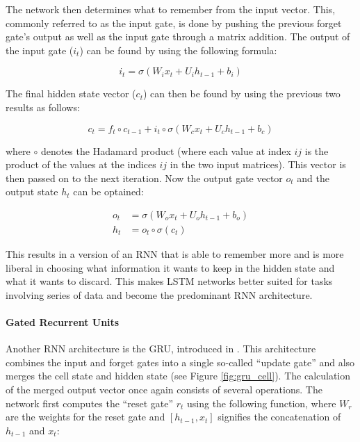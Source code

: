         The network then determines what to remember from the input vector.
        This, commonly referred to as the input gate, is done by pushing the previous forget gate's output as well as the input gate through a matrix addition. 
        The output of the input gate ($i_t$) can be found by using the following formula:

        \begin{equation}
            i_t = \sigma(W_i x_t + U_i h_{t-1} + b_i)
            \label{eq:input_vector_lstm}
        \end{equation}

        The final hidden state vector ($c_t$) can then be found by using the previous two results as follows:

        \begin{equation}
            c_t = f_t \circ c_{t-1} + i_t \circ \sigma(W_c x_t + U_c h_{t-1} + b_c)
            \label{eq:hidden_state_vector_lstm}
        \end{equation}

        where $\circ$ denotes the Hadamard product (where each value at index $ij$ is the product of the values at the indices $ij$ in the two input matrices).
        This vector is then passed on to the next iteration. 
        Now the output gate vector $o_t$ and the output state $h_t$ can be optained:

        \begin{align} 
            o_t &= \sigma(W_o x_t + U_o h_{t-1} + b_o) \label{eq:output_gate_lstm}\\
            h_t &= o_t \circ \sigma(c_t) \label{eq:hidden_output_gate_lstm}
        \end{align}

        This results in a version of an RNN that is able to remember more and is more liberal in choosing what information it wants to keep in the hidden state and what it wants to discard. 
        This makes LSTM networks better suited for tasks involving series of data and become the predominant RNN architecture. 

        \paragraph{Gated Recurrent Units} Another RNN architecture is the GRU, introduced in \cite{cho2014learning}. 
        This architecture combines the input and forget gates into a single so-called ``update gate'' and also merges the cell state and hidden state (see Figure \ref{fig:gru_cell}). 
        The calculation of the merged output vector once again consists of several operations.
        The network first computes the ``reset gate'' $r_t$ using the following function, where $W_r$ are the weights for the reset gate and $[h_{t-1}, x_t]$ signifies the concatenation of $h_{t-1}$ and $x_t$:

